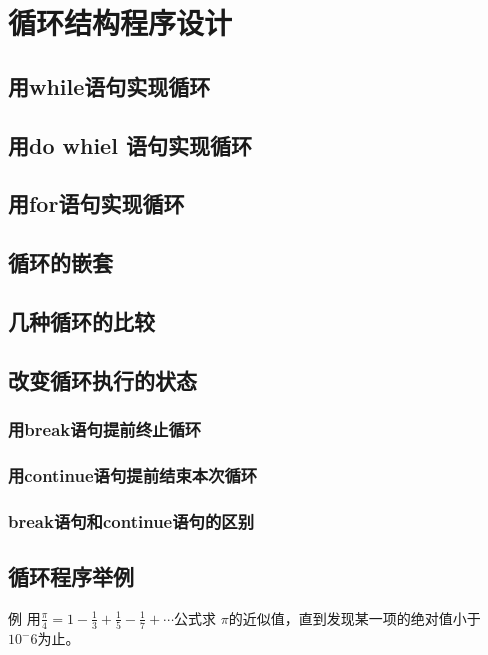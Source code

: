 \chapter{循环结构程序设计}
\section{用while语句实现循环}
\section{用do whiel 语句实现循环}
\section{用for语句实现循环}
\section{循环的嵌套}
\section{几种循环的比较}
\section{改变循环执行的状态}
\subsection{用break语句提前终止循环}
\subsection{用continue语句提前结束本次循环}
\subsection{break语句和continue语句的区别}
\section{循环程序举例}
例 用$\frac{\pi}{4} =1 - \frac{1}{3} + \frac{1}{5}- \frac{1}{7} + \cdots$公式求 $\pi$的近似值，直到发现某一项的绝对值小于 $10^-6$为止。
